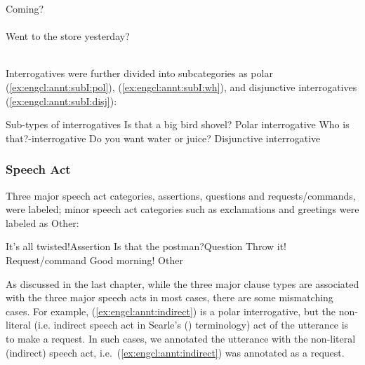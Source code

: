 \bxl\label{ex:engcl:annt:disamb:dec} Coming? \\
\cmark {}\\
\xmark {}
\ex \label{ex:engcl:annt:disamb:int} Went to the store yesterday? \\
\cmark {}\\
\xmark {}
\exl
\eex

Interrogatives were further divided into subcategories as polar (\ref{ex:engcl:annt:subI:pol}), \twh{} (\ref{ex:engcl:annt:subI:wh}), and disjunctive interrogatives (\ref{ex:engcl:annt:subI:disj}):

	Sub-types of interrogatives
\bxl\label{ex:engcl:annt:subI:pol}
Is that a big bird shovel? \hfill	Polar interrogative
\ex\label{ex:engcl:annt:subI:wh}	Who is that?\hfill	\twh-interrogative
\ex\label{ex:engcl:annt:subI:disj}	Do you want water or juice? \hfill Disjunctive interrogative
\exl
\eex

\subsubsection{Speech Act}

Three major speech act categories, assertions, questions and requests/commands, were labeled;%
minor speech act categories such as exclamations and greetings were labeled as Other:

\bxl\label{ex:engcl:annt:sp:a} It’s all twisted!\hfill	Assertion
\ex\label{ex:engcl:annt:sp:q} Is that the postman?\hfill		Question
\ex\label{ex:engcl:annt:sp:r} Throw it!	\hfill		Request/command
\ex \label{ex:engcl:annt:sp:o} Good morning! \hfill Other
\exl
\eex

As discussed in the last chapter, while the three major clause types are associated with the three major speech acts in most cases, there are some mismatching cases. For example, (\ref{ex:engcl:annt:indirect}) is a polar interrogative, but the non-literal (i.e. indirect speech act in Searle's (\cite*{searle1975indirect}) terminology) act of the utterance is to make a request.
In such cases, we annotated the utterance with the non-literal (indirect) speech act, i.e.\ (\ref{ex:engcl:annt:indirect}) was annotated as a request.

